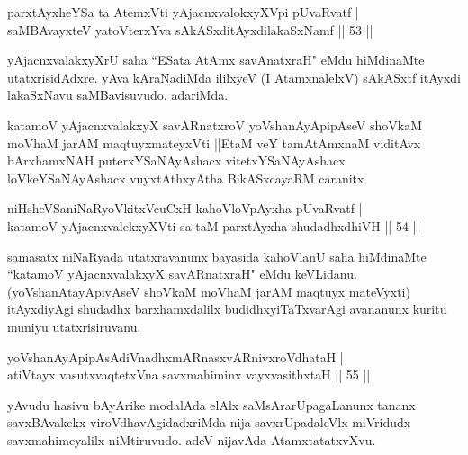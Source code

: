 \begin{shl}
parxtAyxheYSa ta AtemxVti yAjacnxvalokxyXV\s pi pUvaRvatf |\\
saMBAvayxteV yatoV\s terxYva sAkASxditAyxdilakaSxNamf \hfill || 53 ||
\end{shl}

\begin{artha}
yAjacnxvalakxyXrU saha ``ESata AtAmx savAnatxraH" eMdu hiMdinaMte utatxrisidAdxre. yAva kAraNadiMda ililxyeV (I AtamxnalelxV) sAkASxtf itAyxdi lakaSxNavu saMBavisuvudo. adariMda.
\end{artha}

\begin{shl}
katamoV yAjacnxvalakxyX savARnatxroV yoV\s shanAyApipAseV shoVkaM moVhaM jarAM maqtuyxmateyxVti ||EtaM veY tamAtAmxnaM viditAvx bArxhamxNAH puterxYSaNAyAshacx vitetxYSaNAyAshacx loVkeYSaNAyAshacx vuyxtAthxyAtha BikASxcayaRM caranitx
\end{shl}

\begin{shl}
niHsheVSaniNaRyoVkitxVcuCxH kahoVloV\s pAyxha pUvaRvatf |\\
katamoV yAjacnxvalekxyXVti sa taM parxtAyxha shudadhxdhiVH \hfill || 54 ||
\end{shl}

\begin{artha}%
samasatx niNaRyada utatxravanunx bayasida kahoVlanU saha hiMdinaMte  ``katamoV yAjacnxvalakxyX savARnatxraH" eMdu keVLidanu. (yoV\s shanAtayApivAseV shoVkaM moVhaM jarAM maqtuyx mateVyxti) itAyxdiyAgi shudadhx barxhamxdalilx budidhxyiTaTxvarAgi avananunx kuritu muniyu utatxrisiruvanu.
\end{artha}


\begin{shl}
yoV\s shanAyApipAsAdiVnadhxmARnasxvARnivxroVdhataH |\\
atiVtayx vasutxvaqtetxVna savxmahiminx vayxvasithxtaH \hfill || 55 ||
\end{shl}

\begin{artha}
yAvudu hasivu bAyArike modalAda elAlx saMsArarUpagaLanunx tananx savxBAvakekx viroVdhavAgidadxriMda nija savxrUpadaleVlx miVridudx savxmahimeyalilx niMtiruvudo. adeV nijavAda AtamxtatatxvXvu.
\end{artha}


